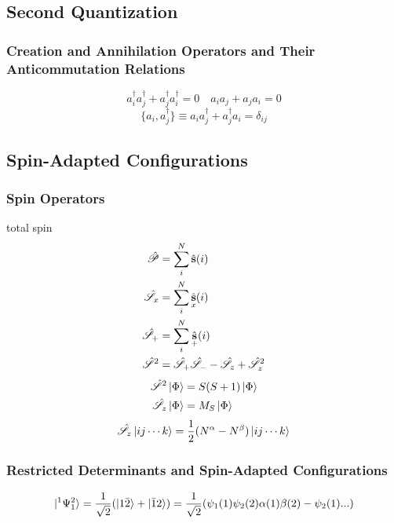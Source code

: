 \documentclass[a4paper]{article}
\DeclareMathOperator{\hs}{\hat{\vb{s}}}
\newcommand{\hsS}{\hat{\mathscr{S}}}
\numberwithin{equation}{section}
\begin{document}
\subsection{Second Quantization}
\subsubsection{Creation and Annihilation Operators and Their Anticommutation Relations}
\begin{equation}\label{key}
a_i^\dagger a_j^\dagger + a_j^\dagger a_i^\dagger = 0 \quad a_i a_j + a_j a_i = 0
\end{equation}
\begin{equation}\label{key}
\{a_i, a_j^\dagger\} \equiv a_i a_j^\dagger + a_j^\dagger a_i = \delta_{ij}
\end{equation}

\subsection{Spin-Adapted Configurations}
\subsubsection{Spin Operators}
total spin
\begin{align}
\hat{\mathscr{P}} &= \sum_i^N \hs(i)\\
\hsS_x &= \sum_i^N \hs_x(i)\\
\hsS_+ &= \sum_i^N \hs_+(i)\\
\hsS^2 &= \hsS_+\hsS_- - \hsS_z + \hsS_z^2
\end{align}
\begin{align}
\hsS^2\ket{\Phi} &= S(S+1)\ket{\Phi}\\
\hsS_z\ket{\Phi} &= M_S\ket{\Phi}
\end{align}
\begin{equation}\label{key}
\hsS_z\ket{ij\cdots k} = \dfrac{1}{2}(N^\alpha - N^\beta)\ket{ij\cdots k}
\end{equation}

\subsubsection{Restricted Determinants and Spin-Adapted Configurations}
\begin{equation}\label{key}
\ket{^1\Psi_1^2} = \dfrac{1}{\sqrt{2}}(\ket{1\bar{2}} + \ket{\bar{1}2})
= \dfrac{1}{\sqrt{2}}(\psi_1(1)\psi_2(2)\alpha(1)\beta(2) - \psi_2(1)...)
\end{equation}
\end{document}
